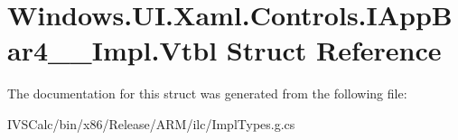 \hypertarget{struct_windows_1_1_u_i_1_1_xaml_1_1_controls_1_1_i_app_bar4_____impl_1_1_vtbl}{}\section{Windows.\+U\+I.\+Xaml.\+Controls.\+I\+App\+Bar4\+\_\+\+\_\+\+Impl.\+Vtbl Struct Reference}
\label{struct_windows_1_1_u_i_1_1_xaml_1_1_controls_1_1_i_app_bar4_____impl_1_1_vtbl}


The documentation for this struct was generated from the following file\+:\begin{DoxyCompactItemize}
\item 
I\+V\+S\+Calc/bin/x86/\+Release/\+A\+R\+M/ilc/Impl\+Types.\+g.\+cs\end{DoxyCompactItemize}
